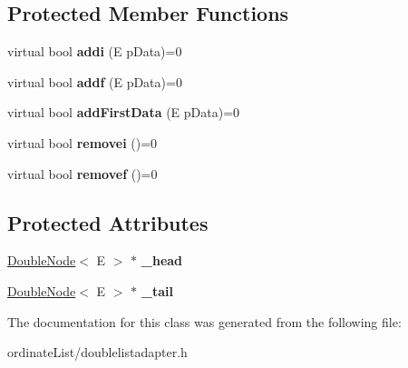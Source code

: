 \subsection*{Protected Member Functions}
\begin{DoxyCompactItemize}
\item 
\hypertarget{class_double_list_adapter_a74a41e06683241f5a7d9b9d0ed38eaf9}{virtual bool {\bfseries addi} (E p\-Data)=0}\label{class_double_list_adapter_a74a41e06683241f5a7d9b9d0ed38eaf9}

\item 
\hypertarget{class_double_list_adapter_adf4e6a8a4479d1fa0e692aea0d254c0f}{virtual bool {\bfseries addf} (E p\-Data)=0}\label{class_double_list_adapter_adf4e6a8a4479d1fa0e692aea0d254c0f}

\item 
\hypertarget{class_double_list_adapter_a024ff60d5cb3e11ff5be795f48deaac0}{virtual bool {\bfseries add\-First\-Data} (E p\-Data)=0}\label{class_double_list_adapter_a024ff60d5cb3e11ff5be795f48deaac0}

\item 
\hypertarget{class_double_list_adapter_a710e75ff353e5e94ae1fb9eadc0b582b}{virtual bool {\bfseries removei} ()=0}\label{class_double_list_adapter_a710e75ff353e5e94ae1fb9eadc0b582b}

\item 
\hypertarget{class_double_list_adapter_a1f069987bb3e8abcccf24659474960c3}{virtual bool {\bfseries removef} ()=0}\label{class_double_list_adapter_a1f069987bb3e8abcccf24659474960c3}

\end{DoxyCompactItemize}
\subsection*{Protected Attributes}
\begin{DoxyCompactItemize}
\item 
\hypertarget{class_double_list_adapter_a1c01340613e7545d5ab74286686053fa}{\hyperlink{class_double_node}{Double\-Node}$<$ E $>$ $\ast$ {\bfseries \-\_\-head}}\label{class_double_list_adapter_a1c01340613e7545d5ab74286686053fa}

\item 
\hypertarget{class_double_list_adapter_a68c6a578e4668b8c28895ac271c4c2b9}{\hyperlink{class_double_node}{Double\-Node}$<$ E $>$ $\ast$ {\bfseries \-\_\-tail}}\label{class_double_list_adapter_a68c6a578e4668b8c28895ac271c4c2b9}

\end{DoxyCompactItemize}


The documentation for this class was generated from the following file\-:\begin{DoxyCompactItemize}
\item 
ordinate\-List/doublelistadapter.\-h\end{DoxyCompactItemize}
